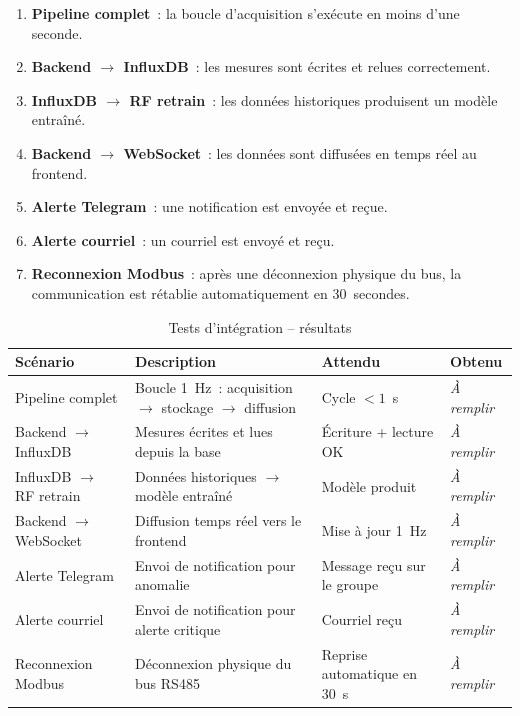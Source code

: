 \begin{enumerate}
  \item \textbf{Pipeline complet}~: la boucle d'acquisition s'exécute en moins d'une seconde.
  \item \textbf{Backend \(\rightarrow\) InfluxDB}~: les mesures sont écrites et relues correctement.
  \item \textbf{InfluxDB \(\rightarrow\) RF retrain}~: les données historiques produisent un modèle entraîné.
  \item \textbf{Backend \(\rightarrow\) WebSocket}~: les données sont diffusées en temps réel au frontend.
  \item \textbf{Alerte Telegram}~: une notification est envoyée et reçue.
  \item \textbf{Alerte courriel}~: un courriel est envoyé et reçu.
  \item \textbf{Reconnexion Modbus}~: après une déconnexion physique du bus, la communication est rétablie automatiquement en 30~secondes.
\end{enumerate}

\begin{table}[htbp]
\centering
\renewcommand{\arraystretch}{1.45}
\caption{Tests d'intégration -- résultats}
\label{tab:tests_integration}
\begin{tabular}{|p{}|p{}|p{}|p{}|}
\hline
\rowcolor{gray!25}
\textbf{Scénario} & \textbf{Description} & \textbf{Attendu} & \textbf{Obtenu} \\
\hline
Pipeline complet & Boucle 1~Hz~: acquisition \(\rightarrow\) stockage \(\rightarrow\) diffusion & Cycle \(<1\)~s & \textit{À remplir} \\
\hline
Backend \(\rightarrow\) InfluxDB & Mesures écrites et lues depuis la base & Écriture + lecture OK & \textit{À remplir} \\
\hline
InfluxDB \(\rightarrow\) RF retrain & Données historiques \(\rightarrow\) modèle entraîné & Modèle produit & \textit{À remplir} \\
\hline
Backend \(\rightarrow\) WebSocket & Diffusion temps réel vers le frontend & Mise à jour 1~Hz & \textit{À remplir} \\
\hline
Alerte Telegram & Envoi de notification pour anomalie & Message reçu sur le groupe & \textit{À remplir} \\
\hline
Alerte courriel & Envoi de notification pour alerte critique & Courriel reçu & \textit{À remplir} \\
\hline
Reconnexion Modbus & Déconnexion physique du bus RS485 & Reprise automatique en 30~s & \textit{À remplir} \\
\hline
\end{tabular}
\end{table}

